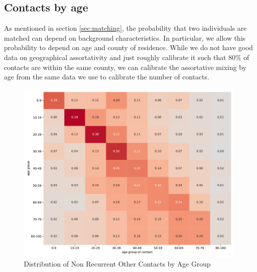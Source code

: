\FloatBarrier


\subsection{Contacts by age}
\label{subsec:contacts_by_age}

As mentioned in section \ref{sec:matching}, the probability that two individuals are
matched can depend on background characteristics. In particular, we allow this
probability to depend on age and county of residence. While we do not have good data on
geographical assortativity and just roughly calibrate it such that 80\% of contacts are
within the same county, we can calibrate the assortative mixing by age from the same
data we use to calibrate the number of contacts.

\begin{figure}[ht]
    \centering
    \includegraphics[width=0.9 \textwidth]{../figures/results/figures/data/assortativity_other_non_recurrent}
    \caption{Distribution of Non Recurrent Other Contacts by Age Group}
    \label{fig:assortativity_other}
\end{figure}


